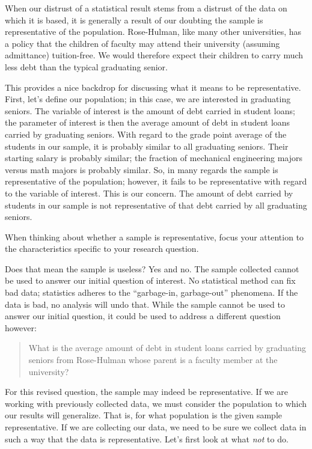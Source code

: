 \documentclass[]{book}
\theoremstyle{definition}
\theoremstyle{definition}
\theoremstyle{remark}
\let\BeginKnitrBlock\begin \let\EndKnitrBlock\end
\begin{document}
When our distrust of a statistical result stems from a distrust of the
data on which it is based, it is generally a result of our doubting the
sample is representative of the population. Rose-Hulman, like many other
universities, has a policy that the children of faculty may attend their
university (assuming admittance) tuition-free. We would therefore expect
their children to carry much less debt than the typical graduating
senior.

This provides a nice backdrop for discussing what it means to be
representative. First, let's define our population; in this case, we are
interested in graduating seniors. The variable of interest is the amount
of debt carried in student loans; the parameter of interest is then the
average amount of debt in student loans carried by graduating seniors.
With regard to the grade point average of the students in our sample, it
is probably similar to all graduating seniors. Their starting salary is
probably similar; the fraction of mechanical engineering majors versus
math majors is probably similar. So, in many regards the sample is
representative of the population; however, it fails to be representative
with regard to the variable of interest. This is our concern. The amount
of debt carried by students in our sample is not representative of that
debt carried by all graduating seniors.

\BeginKnitrBlock{rmdtip}
When thinking about whether a sample is representative, focus your
attention to the characteristics specific to your research question.
\EndKnitrBlock{rmdtip}

Does that mean the sample is useless? Yes and no. The sample collected
cannot be used to answer our initial question of interest. No
statistical method can fix bad data; statistics adheres to the
``garbage-in, garbage-out'' phenomena. If the data is bad, no analysis
will undo that. While the sample cannot be used to answer our initial
question, it could be used to address a different question however:

\begin{quote}
What is the average amount of debt in student loans carried by
graduating seniors from Rose-Hulman whose parent is a faculty member at
the university?
\end{quote}

For this revised question, the sample may indeed be representative. If
we are working with previously collected data, we must consider the
population to which our results will generalize. That is, for what
population is the given sample representative. If we are collecting our
data, we need to be sure we collect data in such a way that the data is
representative. Let's first look at what \emph{not} to do.
\end{document}
